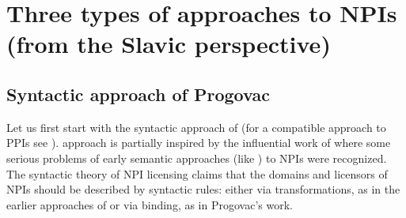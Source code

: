\documentclass[output=paper,colorlinks,citecolor=brown]{langscibook}
\begin{document}
\section{Three types of approaches to NPIs (from the Slavic perspective)}\label{three-types-of-approaches-to-npis-from-the-slavic-perspective}

\subsection{Syntactic approach of Progovac}\label{syntactic-approach-of-progovac}

Let us first start with the syntactic approach of \citet{progovac1994negative} (for a compatible approach to PPIs see  \citealt{szabolcsi2004positive}).  approach is partially inspired by the influential work of \citet{linebarger1987negative} where some serious problems of early semantic approaches (like \citealt{fauconnier1978implication, fauconnier1980pragmatic, ladusaw1979polarity}) to NPIs were recognized. The syntactic theory of NPI licensing claims that the domains and licensors of NPIs should be described by syntactic rules: either via transformations, as in the earlier approaches of \citet{klima1964negation} or via binding, as in Progovac's work. 
\end{document}
